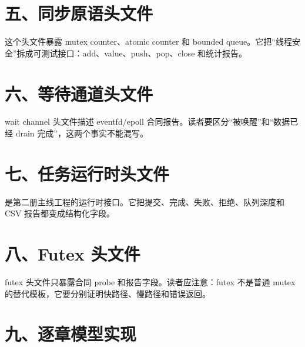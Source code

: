 

\section{五、同步原语头文件}

这个头文件暴露 mutex counter、atomic counter 和 bounded queue。它把“线程安全”拆成可测试接口：add、value、push、pop、close 和统计报告。



\section{六、等待通道头文件}

wait channel 头文件描述 eventfd/epoll 合同报告。读者要区分“被唤醒”和“数据已经 drain 完成”，这两个事实不能混写。



\section{七、任务运行时头文件}

 是第二册主线工程的运行时接口。它把提交、完成、失败、拒绝、队列深度和 CSV 报告都变成结构化字段。



\section{八、Futex 头文件}

futex 头文件只暴露合同 probe 和报告字段。读者应注意：futex 不是普通 mutex 的替代模板，它要分别证明快路径、慢路径和错误返回。



\section{九、逐章模型实现}

